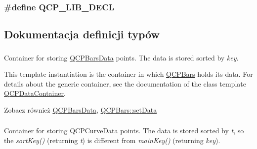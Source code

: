 \subsubsection[{\texorpdfstring{Q\+C\+P\+\_\+\+L\+I\+B\+\_\+\+D\+E\+CL}{QCP_LIB_DECL}}]{\setlength{\rightskip}{0pt plus 5cm}\#define Q\+C\+P\+\_\+\+L\+I\+B\+\_\+\+D\+E\+CL}\hypertarget{qcustomplot_8hh_a5eaab02224a642ded7fb8951e973a02c}{}\label{qcustomplot_8hh_a5eaab02224a642ded7fb8951e973a02c}


\subsection{Dokumentacja definicji typów}
\subsubsection[{\texorpdfstring{Q\+C\+P\+Bars\+Data\+Container}{QCPBarsDataContainer}}]{}\hypertarget{qcustomplot_8hh_a52bf589c9fce1baa36c1d40d69785d46}{}\label{qcustomplot_8hh_a52bf589c9fce1baa36c1d40d69785d46}
Container for storing \hyperlink{class_q_c_p_bars_data}{Q\+C\+P\+Bars\+Data} points. The data is stored sorted by {\itshape key}.

This template instantiation is the container in which \hyperlink{class_q_c_p_bars}{Q\+C\+P\+Bars} holds its data. For details about the generic container, see the documentation of the class template \hyperlink{class_q_c_p_data_container}{Q\+C\+P\+Data\+Container}.

\begin{DoxySeeAlso}{Zobacz również}
\hyperlink{class_q_c_p_bars_data}{Q\+C\+P\+Bars\+Data}, \hyperlink{class_q_c_p_bars_a6dc562ec7120a8521e1061f2134367e4}{Q\+C\+P\+Bars\+::set\+Data} 
\end{DoxySeeAlso}
\subsubsection[{\texorpdfstring{Q\+C\+P\+Curve\+Data\+Container}{QCPCurveDataContainer}}]{}\hypertarget{qcustomplot_8hh_aaeee80d5664ea91beb9d7968790d0e65}{}\label{qcustomplot_8hh_aaeee80d5664ea91beb9d7968790d0e65}
Container for storing \hyperlink{class_q_c_p_curve_data}{Q\+C\+P\+Curve\+Data} points. The data is stored sorted by {\itshape t}, so the {\itshape sort\+Key()} (returning {\itshape t}) is different from {\itshape main\+Key()} (returning {\itshape key}).


